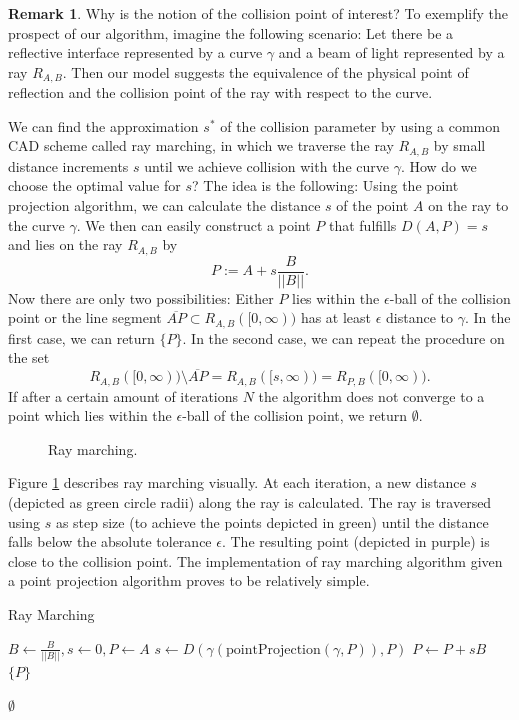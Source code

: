 \documentclass[a4paper, 11pt]{report}
\theoremstyle{definition}
\newtheorem*{remark}{Remark}
\begin{document}
	\begin{remark}
		Why is the notion of the collision point of interest? To exemplify the prospect of our algorithm, imagine the following scenario: Let there be a reflective interface represented by a curve $\gamma$ and a beam of light represented by a ray $R_{A,B}$. Then our model suggests the equivalence of the physical point of reflection and the collision point of the ray with respect to the curve.
	\end{remark}

	We can find the approximation $s^*$ of the collision parameter by using a common CAD scheme called ray marching, in which we traverse the ray $R_{A,B}$ by small distance increments $s$ until we achieve collision with the curve $\gamma$. How do we choose the optimal value for $s$? The idea is the following: Using the point projection algorithm, we can calculate the distance $s$ of the point $A$ on the ray to the curve $\gamma$. We then can easily construct a point $P$ that fulfills $D(A,P) = s$ and lies on the ray $R_{A,B}$ by 
		$$ P := A+s\frac{B}{||B||}.$$
	Now there are only two possibilities: Either $P$ lies within the $\epsilon$-ball of the collision point or the line segment $\overline{AP} \subset R_{A,B}([0,\infty))$ has at least $\epsilon$ distance to $\gamma$. In the first case, we can return $\{P\}$. In the second case, we can repeat the procedure on the set 
		$$ R_{A,B}([0,\infty)) \setminus \overline{AP} = R_{A,B}([s,\infty)) = R_{P,B}([0,\infty)).$$
	If after a certain amount of iterations $N$ the algorithm does not converge to a point which lies within the $\epsilon$-ball of the collision point, we return $\emptyset$.

	\begin{figure}[H]
		\centering
		
		\caption{Ray marching.}
		\label{fig:raymarchingvis}
	\end{figure}

	Figure \ref{fig:raymarchingvis} describes ray marching visually. At each iteration, a new distance $s$ (depicted as green circle radii) along the ray is calculated. The ray is traversed using $s$ as step size (to achieve the points depicted in green) until the distance falls below the absolute tolerance $\epsilon$. The resulting point (depicted in purple) is close to the collision point. The implementation of ray marching algorithm given a point projection algorithm proves to be relatively simple.

	\begin{algorithm}[H]
		\begin{algorithmic}[1]

			\caption{Ray Marching}\label{alg:raymarching}
				\State $B \gets \frac{B}{||B||}, s \gets 0, P \gets A$
					\State $s \gets D(\gamma(\text{pointProjection}(\gamma, P)), P)$
					\State $P \gets P + sB$
						\State \Return $\{P\}$
					\EndIf
				\EndFor

				\State \Return $\emptyset$
			\EndProcedure
		\end{algorithmic}
	\end{algorithm}
\end{document}
